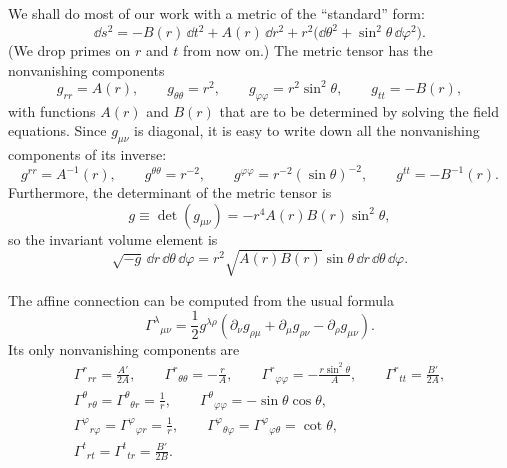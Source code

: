 We shall do most of our work with a metric of the ``standard'' form:
\begin{equation}
  \dd s^2
  =
  -B(r)\,\dd t^2+A(r)\,\dd r^2
  +r^2\bigl(\dd\theta^2+\sin^2\theta\,\dd\varphi^2\bigr).
  \tag{8.1.6}\label{eq:8.1.6}
\end{equation}
(We drop primes on \(r\) and \(t\) from now on.) The metric tensor has the
nonvanishing components
\begin{equation}
  g_{rr}=A(r),\qquad
  g_{\theta\theta}=r^2,\qquad
  g_{\varphi\varphi}=r^2\sin^2\theta,\qquad
  g_{tt}=-B(r),
  \tag{8.1.7}\label{eq:8.1.7}
\end{equation}
with functions \(A(r)\) and \(B(r)\) that are to be determined by solving
the field equations. Since \(g_{\mu\nu}\) is diagonal, it is easy to write
down all the nonvanishing components of its inverse:
\begin{equation}
  g^{rr}=A^{-1}(r),\qquad
  g^{\theta\theta}=r^{-2},\qquad
  g^{\varphi\varphi}=r^{-2}(\sin\theta)^{-2},\qquad
  g^{tt}=-B^{-1}(r).
  \tag{8.1.8}\label{eq:8.1.8}
\end{equation}
Furthermore, the determinant of the metric tensor is
\begin{equation}
  g\equiv\det(g_{\mu\nu})
  =-r^4A(r)B(r)\sin^2\theta,
  \tag{8.1.9}\label{eq:8.1.9}
\end{equation}
so the invariant volume element is
\begin{equation}
  \sqrt{-g}\,\dd r\,\dd\theta\,\dd\varphi
  =
  r^2\sqrt{A(r)B(r)}\sin\theta\,\dd r\,\dd\theta\,\dd\varphi.
  \tag{8.1.10}\label{eq:8.1.10}
\end{equation}

The affine connection can be computed from the usual formula
\[
  \Gamma^\lambda{}_{\mu\nu}
  =
  \frac12g^{\lambda\rho}
  \left(
    \partial_\nu g_{\rho\mu}
    +\partial_\mu g_{\rho\nu}
    -\partial_\rho g_{\mu\nu}
  \right).
\]
Its only nonvanishing components are
\begin{equation}
  \begin{gathered}
  \Gamma^r{}_{rr}=\frac{A'}{2A},
  \qquad
  \Gamma^r{}_{\theta\theta}=-\frac{r}{A},
  \qquad
  \Gamma^r{}_{\varphi\varphi}=-\frac{r\sin^2\theta}{A},
  \qquad
  \Gamma^r{}_{tt}=\frac{B'}{2A},
  \\
  \Gamma^\theta{}_{r\theta}
  =\Gamma^\theta{}_{\theta r}=\frac1r,
  \qquad
  \Gamma^\theta{}_{\varphi\varphi}=-\sin\theta\cos\theta,
  \\
  \Gamma^\varphi{}_{r\varphi}
  =\Gamma^\varphi{}_{\varphi r}=\frac1r,
  \qquad
  \Gamma^\varphi{}_{\theta\varphi}
  =\Gamma^\varphi{}_{\varphi\theta}=\cot\theta,
  \\
  \Gamma^t{}_{rt}
  =\Gamma^t{}_{tr}=\frac{B'}{2B}.
  \end{gathered}
  \tag{8.1.11}\label{eq:8.1.11}
\end{equation}

